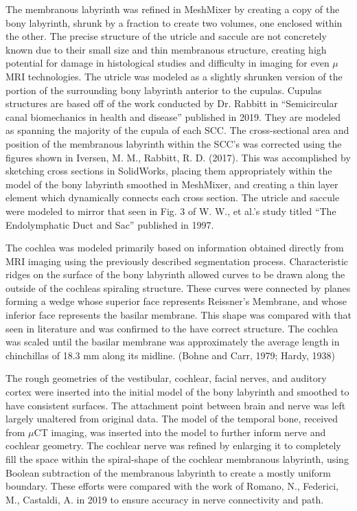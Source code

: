 \documentclass[12pt]{article}
\begin{document}
The membranous labyrinth was refined in MeshMixer by creating a copy of the bony labyrinth, shrunk by a fraction to create two volumes, one enclosed within the other. The precise structure of the utricle and saccule are not concretely known due to their small size and thin membranous structure, creating high potential for damage in histological studies and difficulty in imaging for even $\mu$MRI technologies. The utricle was modeled as a slightly shrunken version of the portion of the surrounding bony labyrinth anterior to the cupulas. Cupulas structures are based off of the work conducted by Dr. Rabbitt in “Semicircular canal biomechanics in health and disease” published in 2019. \cite{rabbitt} They are modeled as spanning the majority of the cupula of each SCC. The cross-sectional area and position of the membranous labyrinth within the SCC’s was corrected using the figures shown in Iversen, M. M., Rabbitt, R. D. (2017). \cite{iversen} This was accomplished by sketching cross sections in SolidWorks, placing them appropriately within the model of the bony labyrinth smoothed in MeshMixer, and creating a thin layer element which dynamically connects each cross section. The utricle and saccule were modeled to mirror that seen in Fig. 3 of W. W., et al.’s study titled “The Endolymphatic Duct and Sac” published in 1997.

The cochlea was modeled primarily based on information obtained directly from MRI imaging using the previously described segmentation process. Characteristic ridges on the surface of the bony labyrinth allowed curves to be drawn along the outside of the cochleas spiraling structure. These curves were connected by planes forming a wedge whose superior face represents Reissner’s Membrane, and whose inferior face represents the basilar membrane. This shape was compared with that seen in literature and was confirmed to the have correct structure. \cite{trevino:chinchmodel} \cite{ekdale:chinchanat} \cite{ni:cochmcx} The cochlea was scaled until the basilar membrane was approximately the average length in chinchillas of 18.3 mm along its midline. (Bohne and Carr, 1979; Hardy, 1938) 
 
The rough geometries of the vestibular, cochlear, facial nerves, and auditory cortex were inserted into the initial model of the bony labyrinth and smoothed to have consistent surfaces. The attachment point between brain and nerve was left largely unaltered from original data. The model of the temporal bone, received from $\mu$CT imaging, was inserted into the model to further inform nerve and cochlear geometry. The cochlear nerve was refined by enlarging it to completely fill the space within the spiral-shape of the cochlear membranous labyrinth, using Boolean subtraction of the membranous labyrinth to create a mostly uniform boundary. These efforts were compared with the work of Romano, N., Federici, M., Castaldi, A. in 2019 to ensure accuracy in nerve connectivity and path. \cite{romano:nerves}
 
\end{document}
